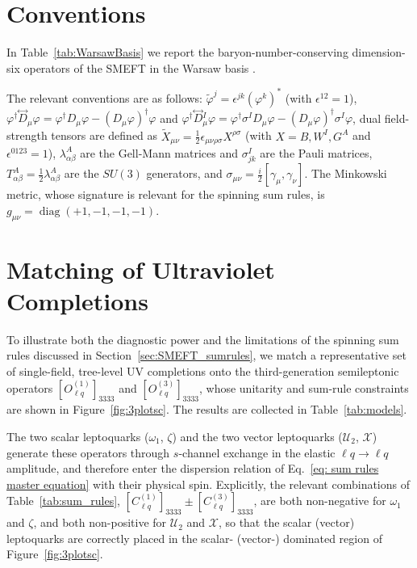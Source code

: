 \begin{subappendices}

\section{Conventions\label{app:SMEFT_conv}}
In Table~\ref{tab:WarsawBasis} we report the baryon-number-conserving dimension-six operators of the SMEFT in the Warsaw basis \cite{Grzadkowski:2010es}.
%


The relevant conventions are as follows: $\widetilde \varphi^j = \epsilon^{jk} (\varphi^k)^*$ (with $\epsilon^{12}=1$), $\varphi^\dagger \overset{\leftrightarrow}{D}{}_\mu \varphi = \varphi^\dagger D_\mu \varphi - (D_\mu \varphi)^\dagger \varphi$ and $\varphi^\dagger \overset{\leftrightarrow}{D}{}_\mu^I \varphi = \varphi^\dagger \sigma^I D_\mu \varphi - (D_\mu \varphi)^\dagger \sigma^I \varphi$, dual field-strength tensors are defined as $\widetilde X_{\mu\nu} = \frac{1}{2}\epsilon_{\mu\nu\rho\sigma}X^{\rho\sigma}$ (with $X=B,W^I,G^A$ and $\epsilon^{0123} = 1$), $\lambda^A_{\alpha\beta}$ are the Gell-Mann matrices and $\sigma^I_{jk}$ are the Pauli matrices, $T_{\alpha\beta}^A = \frac{1}{2}\lambda^A_{\alpha\beta}$ are the $SU(3)$ generators, and $\sigma_{\mu\nu} = \frac{i}{2}[\gamma_\mu,\gamma_\nu]$.
The Minkowski metric, whose signature is relevant for the spinning sum rules, is $g_{\mu\nu} = \operatorname{diag}(+1,-1,-1,-1)$.

\section{Matching of Ultraviolet Completions\label{app:SMEFT_UV}}

To illustrate both the diagnostic power and the limitations of the spinning sum
rules discussed in Section~\ref{sec:SMEFT_sumrules}, we match a
representative set of single-field, tree-level UV completions \cite{deBlas:2017xtg}
onto the third-generation semileptonic operators $[O_{\ell q}^{(1)}]_{3333}$ and
$[O_{\ell q}^{(3)}]_{3333}$, whose unitarity and sum-rule constraints are shown in
Figure~\ref{fig:3plotsc}. The results are collected in Table~\ref{tab:models}.
%


The two scalar leptoquarks ($\omega_1$, $\zeta$) and the two vector leptoquarks
($\mathcal{U}_2$, $\mathcal{X}$) generate these operators through $s$-channel
exchange in the elastic $\ell q \to \ell q$ amplitude, and therefore enter the
dispersion relation of Eq.~\eqref{eq: sum rules master equation} with their physical
spin. 
Explicitly, the relevant combinations of Table~\ref{tab:sum_rules},
$[C_{\ell q}^{(1)}]_{3333} \pm [C_{\ell q}^{(3)}]_{3333}$, are both non-negative for
$\omega_1$ and $\zeta$, and both non-positive for $\mathcal{U}_2$ and $\mathcal{X}$,
so that the scalar (vector) leptoquarks are correctly placed in the scalar-
(vector-) dominated region of Figure~\ref{fig:3plotsc}.


\end{subappendices}
